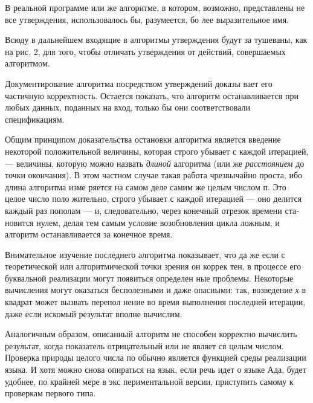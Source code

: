 В  реальной  программе  или  же  алгоритме,  в  котором,  возможно, 
представлены  не  все  утверждения,  использовалось бы,  разумеется,  бо­
лее  выразительное имя.

Всюду  в дальнейшем входящие в алгоритмы утверждения  будут за­
тушеваны,  как  на  рис.  2,  для  того,  чтобы  отличать  утверждения  от 
действий,  совершаемых  алгоритмом.

Документирование  алгоритма  посредством  утверждений  доказы­
вает  его  частичную  корректность.  Остается  показать,  что  алгоритм 
останавливается  при любых данных,  поданных на вход, только бы они 
соответствовали спецификациям.

Общим  принципом  доказательства  остановки  алгоритма  является 
введение  некоторой положительной величины,  которая строго убывает 
с  каждой  итерацией,  — величины,  которую  можно  назвать 
\textit{длиной}  ал­горитма  (или  же \textit{расстоянием}
  до  точки  окончания).  В  этом  частном 
случае  такая  работа  чрезвычайно  проста,  ибо  длина  алгоритма изме­
ряется  на самом деле самим же  целым числом 
п.
  Это целое  число поло­
жительно, строго убывает с каждой итерацией — оно делится  каждый 
раз  пополам — и, следовательно,  через  конечный отрезок времени ста­
новится  нулем,  делая тем самым условие возобновления цикла ложным, 
и  алгоритм останавливается за конечное  время.

Внимательное  изучение  последнего  алгоритма показывает,  что да­
же если с теоретической или алгоритмической точки зрения он коррек­
тен, в процессе его буквальной реализации  могут появиться определен­
ные  проблемы.  Некоторые  вычисления  могут  оказаться  бесполезными 
и даже опасными: так,  возведение \textit{х}
  в квадрат может вызвать перепол­
нение  во  время  выполнения  последней  итерации,  даже  если  искомый 
результат  вполне  вычислим.

Аналогичным образом, описанный алгоритм не способен  корректно 
вычислить  результат,  когда показатель отрицательный  или  не являет­
ся  целым  числом.  Проверка природы целого числа 
по
  обычно является 
функцией  среды  реализации  языка.  И  хотя  можно  снова опираться  на 
язык, если речь идет о языке Ада, будет удобнее, по крайней мере в экс­
периментальной версии, приступить самому к проверкам первого типа.